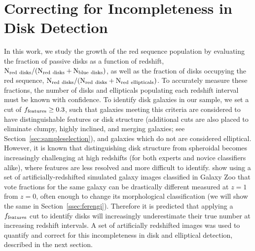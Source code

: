 \documentclass[useAMS,usenatbib]{mn2e}
\begin{document}
\section{Correcting for Incompleteness in Disk Detection}
\label{sec:correction}
In this work, we study the growth of the red sequence population by evaluating the fraction of passive disks as a function of redshift, $\rm N_{red~disks}/(N_{red~disks}+N_{blue~disks})$, as well as the fraction of disks occupying the red sequence, $\rm N_{red~disks}/(N_{red~disks}+N_{red~ellipticals})$. To accurately measure these fractions, the number of disks and ellipticals populating each redshift interval must be known with confidence. To identify disk galaxies in our sample, we set a cut of $f_{\rm features}\ge0.3$, such that galaxies meeting this criteria are considered to have distinguishable features or disk structure (additional cuts are also placed to eliminate clumpy, highly inclined, and merging galaxies; see Section~\ref{sec:sampleselection}), and galaxies which do not are considered elliptical. However, it is known that distinguishing disk structure from spheroidal becomes increasingly challenging at high redshifts (for both experts and novice classifiers alike), where features are less resolved and more difficult to identify. \citet{Willett2016} show using a set of artificially-redshifted simulated galaxy images classified in Galaxy Zoo that vote fractions for the same galaxy can be drastically different measured at $z=1$ from $z=0$, often enough to change its morphological classification (we will show the same in Section~\ref{ssec:ferengi}).  Therefore it is predicted that applying a $f_{\rm features}$ cut to identify disks will increasingly underestimate their true number at increasing redshift intervals. A set of artificially redshifted images was used to quantify and correct for this incompleteness in disk and elliptical detection, described in the next section.
 
\end{document}
